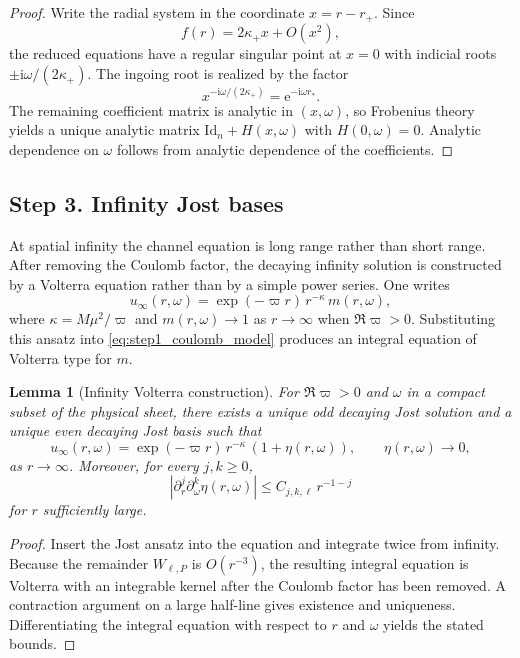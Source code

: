 \documentclass[12pt]{article}
\numberwithin{equation}{section}
\theoremstyle{plain}
\newtheorem{lemma}[theorem]{Lemma}
\theoremstyle{definition}
\theoremstyle{remark}
\newcommand{\ii}{\mathrm i}
\newcommand{\ee}{\mathrm e}
\newcommand{\om}{\omega}
\newcommand{\vp}{\varpi}
\newcommand{\kap}{\kappa}
\newcommand{\abs}[1]{\left|#1\right|}
\newcommand{\Id}{\mathrm{Id}}
\begin{document}
\begin{proof}
Write the radial system in the coordinate $x=r-r_+$.  Since
\[
   f(r)=2\kappa_+x+O(x^2),
\]
the reduced equations have a regular singular point at $x=0$ with indicial roots $\pm\ii\om/(2\kappa_+)$.  The ingoing root is realized by the factor
\[
   x^{-\ii\om/(2\kappa_+)}=\ee^{-\ii\om r_*}.
\]
The remaining coefficient matrix is analytic in $(x,\om)$, so Frobenius theory yields a unique analytic matrix $\Id_n+H(x,\om)$ with $H(0,\om)=0$.  Analytic dependence on $\om$ follows from analytic dependence of the coefficients.
\end{proof}

\subsection*{Step 3. Infinity Jost bases}

At spatial infinity the channel equation is long range rather than short range.  After removing the Coulomb factor, the decaying infinity solution is constructed by a Volterra equation rather than by a simple power series.  One writes
\[
   u_{\infty}(r,\om)=\exp(-\vp r)\,r^{-\kap}\,m(r,\om),
\]
where $\kap=M\mu^2/\vp$ and $m(r,\om)\to1$ as $r\to\infty$ when $\Re\vp>0$.  Substituting this ansatz into \eqref{eq:step1_coulomb_model} produces an integral equation of Volterra type for $m$.

\begin{lemma}[Infinity Volterra construction]\label{lem:infinity_volterra}
For $\Re\vp>0$ and $\om$ in a compact subset of the physical sheet, there exists a unique odd decaying Jost solution and a unique even decaying Jost basis such that
\[
   u_{\infty}(r,\om)=\exp(-\vp r)\,r^{-\kap}\,(1+\eta(r,\om)),
   \qquad
   \eta(r,\om)\to0,
\]
as $r\to\infty$.  Moreover, for every $j,k\ge0$,
\[
   \abs{\partial_r^j\partial_\om^k\eta(r,\om)}\le C_{j,k,\ell}\,r^{-1-j}
\]
for $r$ sufficiently large.
\end{lemma}

\begin{proof}
Insert the Jost ansatz into the equation and integrate twice from infinity.  Because the remainder $W_{\ell,P}$ is $O(r^{-3})$, the resulting integral equation is Volterra with an integrable kernel after the Coulomb factor has been removed.  A contraction argument on a large half-line gives existence and uniqueness.  Differentiating the integral equation with respect to $r$ and $\om$ yields the stated bounds.
\end{proof}
\end{document}
